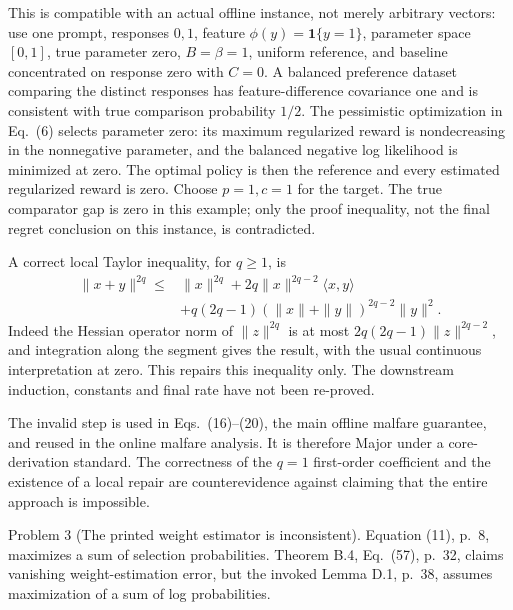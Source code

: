 \documentclass[10pt]{article}
\begin{document}
This is compatible with an actual offline instance, not merely arbitrary vectors: use one prompt, responses \(0,1\), feature \(\phi(y)=\mathbf1\{y=1\}\), parameter space \([0,1]\), true parameter zero, \(B=\beta=1\), uniform reference, and baseline concentrated on response zero with \(C=0\). A balanced preference dataset comparing the distinct responses has feature-difference covariance one and is consistent with true comparison probability \(1/2\). The pessimistic optimization in Eq. (6) selects parameter zero: its maximum regularized reward is nondecreasing in the nonnegative parameter, and the balanced negative log likelihood is minimized at zero. The optimal policy is then the reference and every estimated regularized reward is zero. Choose \(p=1,c=1\) for the target. The true comparator gap is zero in this example; only the proof inequality, not the final regret conclusion on this instance, is contradicted.\par
A correct local Taylor inequality, for \(q\ge1\), is \[\begin{aligned}
 \|x+y\|^{2q}\le{}&\|x\|^{2q}
 +2q\|x\|^{2q-2}\langle x,y\rangle\\
 &+q(2q-1)(\|x\|+\|y\|)^{2q-2}\|y\|^2 .\end{aligned}\] Indeed the Hessian operator norm of \(\|z\|^{2q}\) is at most \(2q(2q-1)\|z\|^{2q-2}\), and integration along the segment gives the result, with the usual continuous interpretation at zero. This repairs this inequality only. The downstream induction, constants and final rate have not been re-proved.\par
The invalid step is used in Eqs. (16)–(20), the main offline malfare guarantee, and reused in the online malfare analysis. It is therefore Major under a core-derivation standard. The correctness of the \(q=1\) first-order coefficient and the existence of a local repair are counterevidence against claiming that the entire approach is impossible.\par
Problem 3 (The printed weight estimator is inconsistent).  Equation (11), p. 8, maximizes a sum of selection probabilities. Theorem B.4, Eq. (57), p. 32, claims vanishing weight-estimation error, but the invoked Lemma D.1, p. 38, assumes maximization of a sum of log probabilities.\par
\end{document}
